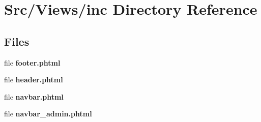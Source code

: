 \section{Src/\+Views/inc Directory Reference}
\label{dir_0f400d64cb58d868843a8146019a2a86}
\subsection*{Files}
\begin{DoxyCompactItemize}
\item 
file \textbf{ footer.\+phtml}
\item 
file \textbf{ header.\+phtml}
\item 
file \textbf{ navbar.\+phtml}
\item 
file \textbf{ navbar\+\_\+admin.\+phtml}
\end{DoxyCompactItemize}
